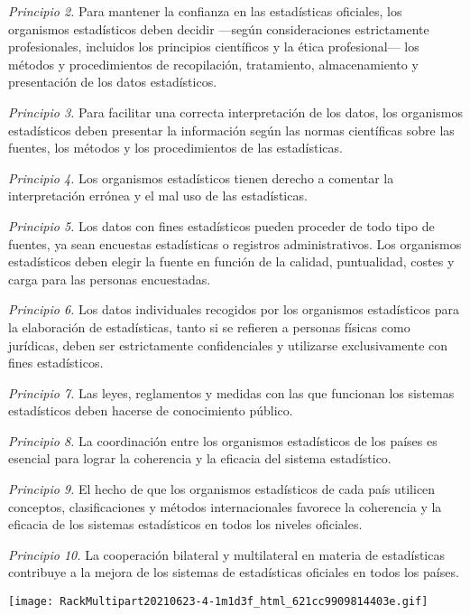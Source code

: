 \documentclass[
]{book}
\begin{document}
\emph{Principio 2.} Para mantener la confianza en las estadísticas oficiales, los organismos estadísticos deben decidir ---según consideraciones estrictamente profesionales, incluidos los principios científicos y la ética profesional--- los métodos y procedimientos de recopilación, tratamiento, almacenamiento y presentación de los datos estadísticos.

\emph{Principio 3.} Para facilitar una correcta interpretación de los datos, los organismos estadísticos deben presentar la información según las normas científicas sobre las fuentes, los métodos y los procedimientos de las estadísticas.

\emph{Principio 4.} Los organismos estadísticos tienen derecho a comentar la interpretación errónea y el mal uso de las estadísticas.

\emph{Principio 5.} Los datos con fines estadísticos pueden proceder de todo tipo de fuentes, ya sean encuestas estadísticas o registros administrativos. Los organismos estadísticos deben elegir la fuente en función de la calidad, puntualidad, costes y carga para las personas encuestadas.

\emph{Principio 6.} Los datos individuales recogidos por los organismos estadísticos para la elaboración de estadísticas, tanto si se refieren a personas físicas como jurídicas, deben ser estrictamente confidenciales y utilizarse exclusivamente con fines estadísticos.

\emph{Principio 7.} Las leyes, reglamentos y medidas con las que funcionan los sistemas estadísticos deben hacerse de conocimiento público.

\emph{Principio 8.} La coordinación entre los organismos estadísticos de los países es esencial para lograr la coherencia y la eficacia del sistema estadístico.

\emph{Principio 9.} El hecho de que los organismos estadísticos de cada país utilicen conceptos, clasificaciones y métodos internacionales favorece la coherencia y la eficacia de los sistemas estadísticos en todos los niveles oficiales.

\emph{Principio 10.} La cooperación bilateral y multilateral en materia de estadísticas contribuye a la mejora de los sistemas de estadísticas oficiales en todos los países.

\texttt{[image: RackMultipart20210623-4-1m1d3f\_html\_621cc9909814403e.gif]}
\end{document}

